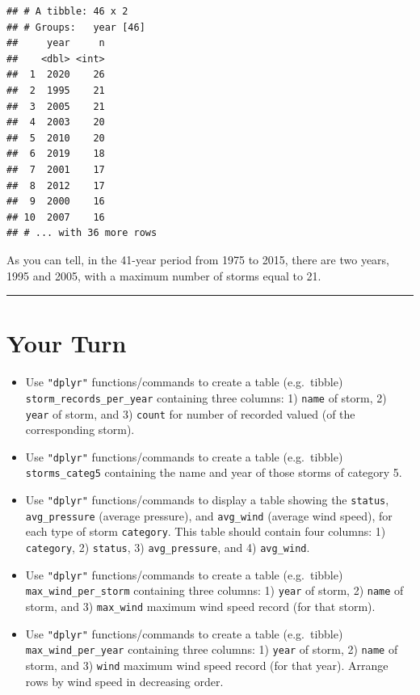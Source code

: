 \documentclass[
]{book}
\begin{document}
\begin{verbatim}
## # A tibble: 46 x 2
## # Groups:   year [46]
##     year     n
##    <dbl> <int>
##  1  2020    26
##  2  1995    21
##  3  2005    21
##  4  2003    20
##  5  2010    20
##  6  2019    18
##  7  2001    17
##  8  2012    17
##  9  2000    16
## 10  2007    16
## # ... with 36 more rows
\end{verbatim}

As you can tell, in the 41-year period from 1975 to 2015, there are two years,
1995 and 2005, with a maximum number of storms equal to 21.

\begin{center}\rule{0.5\linewidth}{0.5pt}\end{center}

\hypertarget{your-turn-3}{%
\section{Your Turn}\label{your-turn-3}}

\begin{itemize}
\item
  Use \texttt{"dplyr"} functions/commands to create a table (e.g.~tibble)
  \texttt{storm\_records\_per\_year} containing three columns: 1) \texttt{name} of storm, 2) \texttt{year}
  of storm, and 3) \texttt{count} for number of recorded valued (of the corresponding
  storm).
\item
  Use \texttt{"dplyr"} functions/commands to create a table (e.g.~tibble)
  \texttt{storms\_categ5} containing the name and year of those storms of category 5.
\item
  Use \texttt{"dplyr"} functions/commands to display a table showing the \texttt{status},
  \texttt{avg\_pressure} (average pressure), and \texttt{avg\_wind} (average wind speed), for
  each type of storm \texttt{category}. This table should contain four columns: 1)
  \texttt{category}, 2) \texttt{status}, 3) \texttt{avg\_pressure}, and 4) \texttt{avg\_wind}.
\item
  Use \texttt{"dplyr"} functions/commands to create a table (e.g.~tibble)
  \texttt{max\_wind\_per\_storm} containing three columns: 1) \texttt{year} of storm, 2) \texttt{name} of
  storm, and 3) \texttt{max\_wind} maximum wind speed record (for that storm).
\item
  Use \texttt{"dplyr"} functions/commands to create a table (e.g.~tibble)
  \texttt{max\_wind\_per\_year} containing three columns: 1) \texttt{year} of storm, 2) \texttt{name} of
  storm, and 3) \texttt{wind} maximum wind speed record (for that year). Arrange rows by
  wind speed in decreasing order.
\end{itemize}

  
\end{document}
